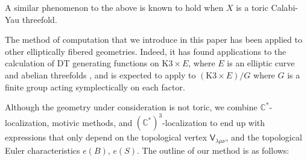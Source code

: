 \documentclass[12pt]{amsart}
\theoremstyle{definition}
\newcommand{\CC} {\mathbb{C}}          %
\newcommand{\sfV}{\mathsf{V}}
\begin{document}
A similar phenomenon to the above is known to hold when $X$ is a toric
Calabi-Yau threefold.


The method of computation that we introduce in this paper has
been applied to other elliptically fibered geometries. Indeed, it has
found applications to the calculation of DT generating functions on
$\textrm{K3} \times E$, where $E$ is an elliptic curve \cite{Bryan-K3xE} and
abelian threefolds \cite{BOPY}, and is expected to apply to $(\textrm{K3}\times
E)/G$ where $G$ is a finite group acting symplectically on each
factor. 

Although the geometry under consideration is not toric, we
combine $\CC^*$-localization, motivic methods, and
$(\CC^{*})^{3}$-localization to end up with expressions that only
depend on the topological vertex $\sfV_{\lambda\mu\nu}$, and the
topological Euler characteristics $e(B)$, $e(S)$. The outline of
our method is as follows:
\end{document}
